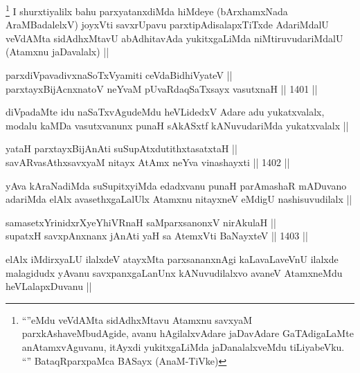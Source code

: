 \begin{artha}
\footnote{``\stext''eMdu veVdAMta sidAdhxMtavu Atamxnu savxyaM parxkAshaveMbudAgide, avanu hAgilalxvAdare jaDavAdare GaTAdigaLaMte anAtamxvAguvanu, itAyxdi yukitxgaLiMda jaDanalalxveMdu tiLiyabeVku. ``\stext'' BataqRparxpaMca BASayx (AnaM-TiVke)}
I shurxtiyalilx bahu parxyatanxdiMda hiMdeye (bArxhamxNada AraMBadalelxV) joyxVti savxrUpavu parxtipAdisalapxTiTxde AdariMdalU veVdAMta sidAdhxMtavU abAdhitavAda yukitxgaLiMda niMtiruvudariMdalU (Atamxnu jaDavalalx) ||
\end{artha}


\begin{shl}
parxdiVpavadivxnaSoTxV\s yamiti ceVdaBidhiVyateV || \\
parxtayxBijAcnxnatoV neYvaM pUvaRdaqSaTxsayx vasutxnaH ||  1401 ||  
\end{shl}

\begin{artha}
diVpadaMte idu naSaTxvAgudeMdu heVLidedxV Adare adu yukatxvalalx, modalu kaMDa vasutxvanunx punaH sAkASxtf kANuvudariMda yukatxvalalx ||
\end{artha}


\begin{shl}
yataH parxtayxBijAnAti suSupAtxdutithxtasatxtaH || \\
savARvasAthxsavxyaM nitayx AtAmx neYva vinashayxti ||  1402 ||  
\end{shl}

\begin{artha}
yAva kAraNadiMda suSupitxyiMda edadxvanu punaH parAmashaR mADuvano adariMda elAlx avasethxgaLalUlx Atamxnu nitayxneV eMdigU nashisuvudilalx ||
\end{artha}


\begin{shl}
samasetxYrinidxrXyeYhiVRnaH saMparxsanonxV nirAkulaH ||  \\
supatxH savxpAnxnanx jAnAti yaH sa AtemxVti BaNayxteV ||  1403 ||  
\end{shl}

\begin{artha}
elAlx iMdirxyaLU ilalxdeV atayxMta parxsananxnAgi kaLavaLaveVnU ilalxde malagidudx yAvanu savxpanxgaLanUnx kANuvudilalxvo avaneV AtamxneMdu heVLalapxDuvanu ||
\end{artha}

